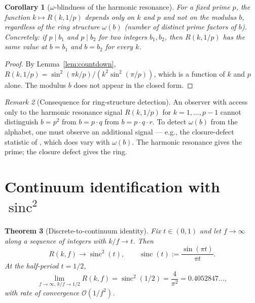 \documentclass[11pt,reqno]{amsart}
\theoremstyle{plain}
\newtheorem{theorem}{Theorem}[section]
\newtheorem{corollary}[theorem]{Corollary}
\theoremstyle{definition}
\theoremstyle{remark}
\newtheorem{remark}[theorem]{Remark}
\DeclareMathOperator{\sinc}{sinc}
\newcommand{\bigO}{\mathcal{O}}
\begin{document}
\begin{corollary}[$\omega$-blindness of the harmonic resonance]
\label{cor:omegablind}
For a fixed prime $p$, the function $k \mapsto R(k, 1/p)$ depends
only on $k$ and $p$ and not on the modulus $b$, regardless of the
ring structure $\omega(b)$ (number of distinct prime factors of $b$).
Concretely: if $p \mid b_1$ and $p \mid b_2$ for two integers
$b_1, b_2$, then $R(k, 1/p)$ has the same value at $b = b_1$ and
$b = b_2$ for every $k$.
\end{corollary}

\begin{proof}
By Lemma~\ref{lem:countdown},
$R(k, 1/p) = \sin^2(\pi k / p) / (k^2 \sin^2(\pi/p))$, which is
a function of $k$ and $p$ alone. The modulus $b$ does not appear
in the closed form.
\end{proof}

\begin{remark}[Consequence for ring-structure detection]
\label{rem:omega-detection}
An observer with access only to the harmonic resonance signal
$R(k, 1/p)$ for $k = 1, \ldots, p-1$ cannot distinguish $b = p^2$
from $b = p \cdot q$ from $b = p \cdot q \cdot r$. To detect
$\omega(b)$ from the alphabet, one must observe an additional
signal --- e.g., the closure-defect statistic of
\cite[\S6]{Sanders2026WP35}, which does vary with $\omega(b)$.
The harmonic resonance gives the prime; the closure defect gives
the ring.
\end{remark}

\section{Continuum identification with $\sinc^2$}
\label{sec:continuum}

\begin{theorem}[Discrete-to-continuum identity]
\label{thm:continuum}
Fix $t \in (0, 1)$ and let $f \to \infty$ along a sequence of
integers with $k / f \to t$. Then
\begin{equation}
  R(k, f) \longrightarrow \sinc^2(t),
  \qquad \sinc(t) := \frac{\sin(\pi t)}{\pi t}.
  \label{eq:continuum}
\end{equation}
At the half-period $t = 1/2$,
\[
  \lim_{f \to \infty,\, k/f \to 1/2} R(k, f) = \sinc^2(1/2) = \frac{4}{\pi^2}
  = 0.4052847\ldots,
\]
with rate of convergence $\bigO(1/f^2)$.
\end{theorem}
\end{document}
